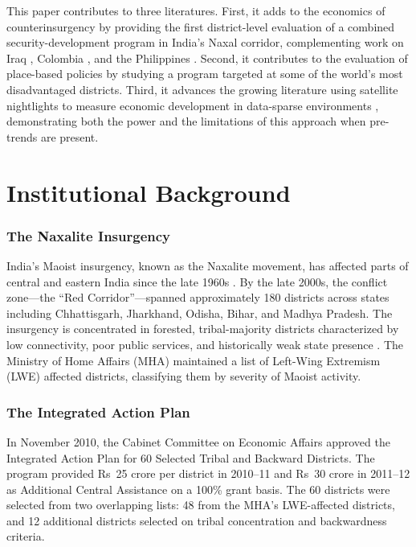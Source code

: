 \documentclass[12pt]{article}
\begin{document}
This paper contributes to three literatures. First, it adds to the economics of counterinsurgency by providing the first district-level evaluation of a combined security-development program in India's Naxal corridor, complementing work on Iraq \citep{berman2011}, Colombia \citep{dube2016}, and the Philippines \citep{crost2014}. Second, it contributes to the evaluation of place-based policies \citep{kline2013, neumark2015, glaeser2008} by studying a program targeted at some of the world's most disadvantaged districts. Third, it advances the growing literature using satellite nightlights to measure economic development in data-sparse environments \citep{henderson2012, michalopoulos2013}, demonstrating both the power and the limitations of this approach when pre-trends are present.

\section{Institutional Background}

\subsubsection*{The Naxalite Insurgency} India's Maoist insurgency, known as the Naxalite movement, has affected parts of central and eastern India since the late 1960s \citep{blattman2010}. By the late 2000s, the conflict zone---the ``Red Corridor''---spanned approximately 180 districts across states including Chhattisgarh, Jharkhand, Odisha, Bihar, and Madhya Pradesh. The insurgency is concentrated in forested, tribal-majority districts characterized by low connectivity, poor public services, and historically weak state presence \citep{vandeneynde2018}. The Ministry of Home Affairs (MHA) maintained a list of Left-Wing Extremism (LWE) affected districts, classifying them by severity of Maoist activity.

\subsubsection*{The Integrated Action Plan} In November 2010, the Cabinet Committee on Economic Affairs approved the Integrated Action Plan for 60 Selected Tribal and Backward Districts. The program provided Rs~25 crore per district in 2010--11 and Rs~30 crore in 2011--12 as Additional Central Assistance on a 100\% grant basis. The 60 districts were selected from two overlapping lists: 48 from the MHA's LWE-affected districts, and 12 additional districts selected on tribal concentration and backwardness criteria.
\end{document}
